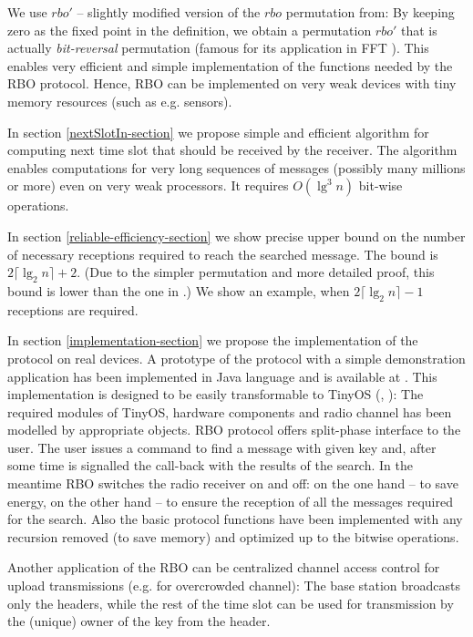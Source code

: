 \documentclass{llncs}
\begin{document}
We use $rbo'$ -- slightly modified version of the $rbo$ permutation from\cite{DBLP:conf/adhoc-now/Kik08}:
By keeping zero as the fixed point in the definition, we
obtain a permutation $rbo'$ that is actually {\em bit-reversal} permutation
(famous for its application in FFT \cite{CormenLR89}).
This enables very efficient and simple implementation
of the functions needed by the RBO protocol.
Hence, RBO can be implemented on very weak devices with tiny memory
resources (such as e.g. sensors).

In section \ref{nextSlotIn-section} we propose simple and efficient 
 algorithm
for computing next time slot that should be received by the receiver.
The algorithm enables 
computations for very long sequences of messages (possibly many millions or more) 
even on very weak processors. It requires $O(\lg^3 n)$ bit-wise operations.

In section \ref{reliable-efficiency-section}
we show precise upper bound on
the number of necessary receptions required 
to reach the searched message.
The bound is $2\lceil\lg_2 n\rceil+2$.
(Due to the simpler permutation and more detailed proof,
this bound is lower than the one in \cite{DBLP:conf/adhoc-now/Kik08}.)
We show an example, when $2\lceil\lg_2 n\rceil-1$ receptions are required.

In section \ref{implementation-section}
we propose the implementation of the protocol on real devices.
A prototype of the protocol with a simple demonstration application 
has been implemented in Java language
and is available at \cite{RBO-WWW}.
This implementation is designed to be 
easily transformable to TinyOS (\cite{TinyOSProgramming}, \cite{TinyOS-WWW}):
The required modules of TinyOS, hardware components and radio channel
has been modelled by appropriate objects.
RBO protocol offers split-phase interface to the user.
The user issues a command to find a message with given key and,
after some time is signalled the call-back with the results
of the search.
In the meantime RBO switches the radio receiver on and off:
on the one hand -- to save energy, on the other hand -- 
to ensure the reception of all the messages required for the search.
Also the basic protocol functions have been implemented with any recursion
removed (to save memory) and optimized up to the bitwise operations. 
 

Another application of the RBO can be centralized channel access
control for upload transmissions (e.g. for overcrowded channel): 
The base station broadcasts only the headers,
while the rest of the time slot can be used for
transmission by the (unique) owner of the key from the header.
\end{document}
